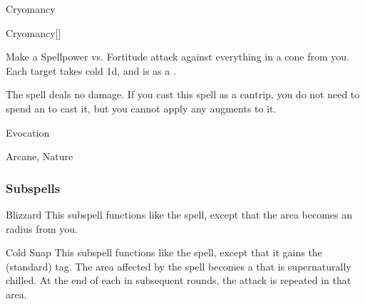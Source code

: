 \newpage
\begin{spellsection}{Cryomancy}

\begin{spellheader}
\end{spellheader}


\begin{ability}{Cryomancy}[]

Make a Spellpower vs. Fortitude attack against everything in a \areamed cone from you.
\hit Each target takes cold  \minus1d, and is  as a .

\end{ability}



 The spell deals no damage. If you cast this spell as a cantrip,
you do not need to spend an  to cast it,
but you cannot apply any augments to it.


 Evocation

 Arcane, Nature
\end{spellsection}


\subsubsection{Subspells}


\begin{ability}[\nth{2}]{Blizzard}
This subspell functions like the  spell, except that the area becomes an \areamed radius from you.
\end{ability}
\vspace{0.25em}


\begin{ability}[\nth{2}]{Cold Snap}
This subspell functions like the  spell, except that it gains the  (standard) tag.
The area affected by the spell becomes a  that is supernaturally chilled.
At the end of each  in subsequent rounds, the attack is repeated in that area.
\end{ability}
\vspace{0.25em}


